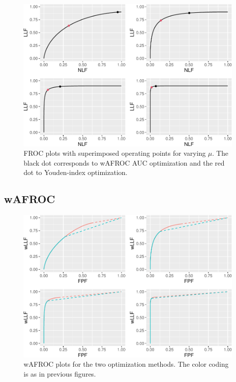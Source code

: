 \documentclass[
]{book}
\begin{document}
\begin{figure}
\centering
\includegraphics{22-optim-op-point_files/figure-latex/optim-op-point-vary-mu-froc-1.pdf}
\caption{\label{fig:optim-op-point-vary-mu-froc}FROC plots with superimposed operating points for varying \(\mu\). The black dot corresponds to wAFROC AUC optimization and the red dot to Youden-index optimization.}
\end{figure}

\hypertarget{wafroc-4}{%
\subsection{wAFROC}\label{wafroc-4}}

\begin{figure}
\centering
\includegraphics{22-optim-op-point_files/figure-latex/optim-op-point-vary-mu-wafroc-1.pdf}
\caption{\label{fig:optim-op-point-vary-mu-wafroc}wAFROC plots for the two optimization methods. The color coding is as in previous figures.}
\end{figure}
\end{document}
